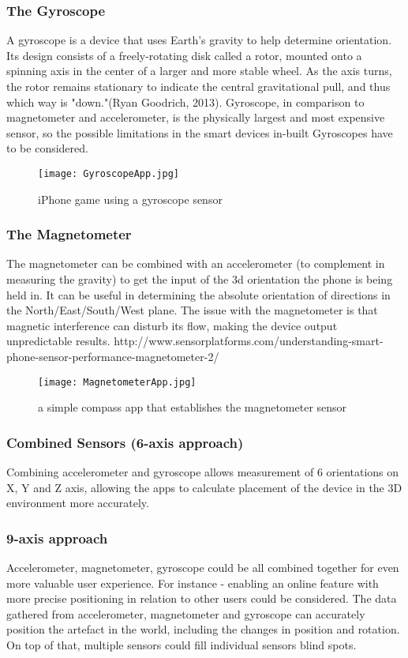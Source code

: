 \subsubsection*{The Gyroscope}
A gyroscope is a device that uses Earth's gravity to help determine orientation. Its design consists of a freely-rotating disk called a rotor, mounted onto a spinning axis in the center of a larger and more stable wheel. As the axis turns, the rotor remains stationary to indicate the central gravitational pull, and thus which way is "down."(Ryan Goodrich, 2013). Gyroscope, in comparison to magnetometer and accelerometer, is the physically largest and most expensive sensor, so the possible limitations in the smart devices in-built Gyroscopes have to be considered. 

\begin{figure}[H]
\centering
\texttt{[image: GyroscopeApp.jpg]}
\caption{iPhone game using a gyroscope sensor}
\end{figure}

\subsubsection*{The Magnetometer}
The magnetometer can be combined with an accelerometer (to complement in measuring the gravity) to get the input of the 3d orientation the phone is being held in. It can be useful in determining the absolute orientation of directions in the North/East/South/West plane. The issue with the magnetometer is that magnetic interference can disturb its flow, making the device output unpredictable results.
http://www.sensorplatforms.com/understanding-smart-phone-sensor-performance-magnetometer-2/

\begin{figure}[H]
\centering
\texttt{[image: MagnetometerApp.jpg]}
\caption{a simple compass app that establishes the magnetometer sensor}
\end{figure}

\subsubsection*{Combined Sensors (6-axis approach)}
Combining accelerometer and gyroscope allows measurement of 6 orientations on X, Y and Z axis, allowing the apps to calculate placement of the device in the 3D environment more accurately.
\subsubsection*{9-axis approach}
Accelerometer, magnetometer, gyroscope could be all combined together for even more valuable user experience. For instance - enabling an online feature with more precise positioning in relation to other users could be considered. The data gathered from accelerometer, magnetometer and gyroscope can accurately position the artefact in the world, including the changes in position and rotation. On top of that, multiple sensors could fill individual sensors blind spots. 

